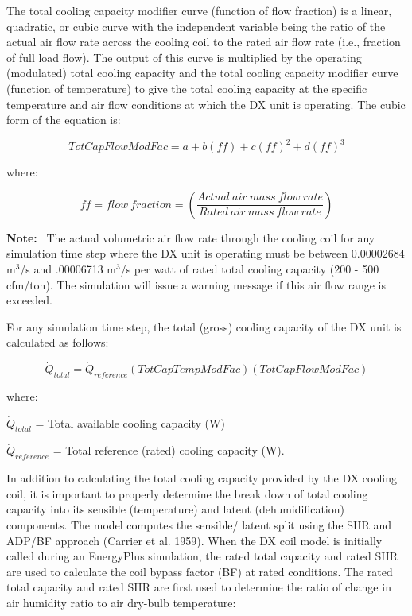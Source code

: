 The total cooling capacity modifier curve (function of flow fraction) is a linear, quadratic, or cubic curve with the independent variable being the ratio of the actual air flow rate across the cooling coil to the rated air flow rate (i.e., fraction of full load flow). The output of this curve is multiplied by the operating (modulated) total cooling capacity and the total cooling capacity modifier curve (function of temperature) to give the total cooling capacity at the specific temperature and air flow conditions at which the DX unit is operating. The cubic form of the equation is:

\begin{equation}
TotCapFlowModFac = a + b\left( {ff} \right) + c{\left( {ff} \right)^2} + d{\left( {ff} \right)^3}
\end{equation}

where:

\begin{equation}
ff = flow~fraction = \left( {\frac{Actual~air~mass~flow~rate}{Rated~air~mass~flow~rate}} \right)
\end{equation}

\textbf{Note:}~ The actual volumetric air flow rate through the cooling coil for any simulation time step where the DX unit is operating must be between 0.00002684 m\(^{3}\)/s and .00006713 m\(^{3}\)/s per watt of rated total cooling capacity (200 - 500 cfm/ton). The simulation will issue a warning message if this air flow range is exceeded.

For any simulation time step, the total (gross) cooling capacity of the DX unit is calculated as follows:

\begin{equation}
{\dot{Q}_{total}} = {\dot{Q}_{reference}}\left( {TotCapTempModFac} \right)\left( {TotCapFlowModFac} \right)
\end{equation}

where:

\({\dot{Q}_{total}}\) = Total available cooling capacity (W)

\({\dot{Q}_{reference}}\) = Total reference (rated) cooling capacity (W).

In addition to calculating the total cooling capacity provided by the DX cooling coil, it is important to properly determine the break down of total cooling capacity into its sensible (temperature) and latent (dehumidification) components. The model computes the sensible/ latent split using the SHR and ADP/BF approach (Carrier et al. 1959). When the DX coil model is initially called during an EnergyPlus simulation, the rated total capacity and rated SHR are used to calculate the coil bypass factor (BF) at rated conditions. The rated total capacity and rated SHR are first used to determine the ratio of change in air humidity ratio to air dry-bulb temperature:

